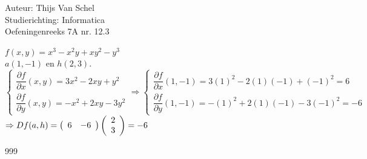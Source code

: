 \documentclass[a4paper]{article}
\begin{document}
  
\noindent \large Auteur: Thijs Van Schel \\
\noindent \large Studierichting: Informatica\\
\noindent \large Oefeningenreeks 7A nr. 12.3\\

\medskip

\normalsize

$f(x,y) = x^3 - x^2y + xy^2 - y^3$ \\

$a(1,-1)$ en $h(2,3)$. \\

$
\left\{ 
\begin{array}{l} 
\dfrac{\partial f}{\partial x}(x,y) = 3x^2 - 2xy + y^2 \\[3ex] 
\dfrac{\partial f}{\partial y}(x,y) = -x^2 + 2xy - 3y^2 
\end{array} 
\right.
\Rightarrow
\left\{ 
\begin{array}{l} 
\dfrac{\partial f}{\partial x}(1,-1) = 3(1)^2 - 2(1)(-1) + (-1)^2 = 6 \\[3ex] 
\dfrac{\partial f}{\partial y}(1,-1) = -(1)^2 + 2(1)(-1) - 3(-1)^2 = -6 
\end{array} 
\right.
$ \\

$\Rightarrow Df(a,h) = \left(\begin{array}{c c} 6 & -6 \end{array}\right) \left(\begin{array}{c} 2 \\ 3 \end{array}\right) = -6$

\begin{thebibliography}{999}
\end{thebibliography}
\end{document}
